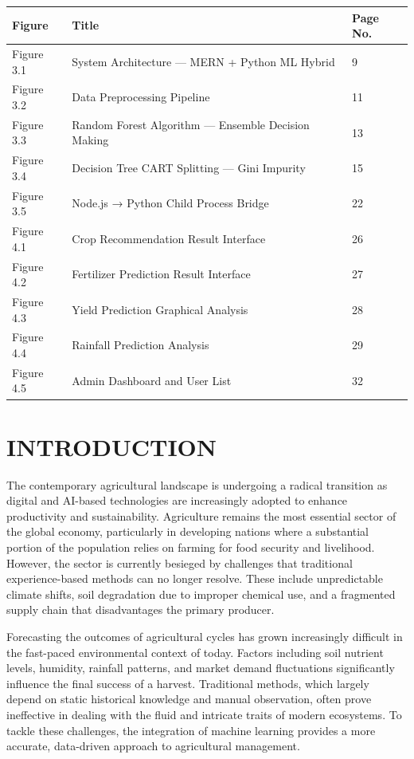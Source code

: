 \documentclass[12pt,a4paper]{report}
\begin{document}
\begin{table}[h!]
\centering
\begin{tabular}{|l|l|l|}
\hline
Figure & Title & Page No. \\ \hline
Figure 3.1 & System Architecture — MERN + Python ML Hybrid & 9 \\ \hline
Figure 3.2 & Data Preprocessing Pipeline & 11 \\ \hline
Figure 3.3 & Random Forest Algorithm — Ensemble Decision Making & 13 \\ \hline
Figure 3.4 & Decision Tree CART Splitting — Gini Impurity & 15 \\ \hline
Figure 3.5 & Node.js → Python Child Process Bridge & 22 \\ \hline
Figure 4.1 & Crop Recommendation Result Interface & 26 \\ \hline
Figure 4.2 & Fertilizer Prediction Result Interface & 27 \\ \hline
Figure 4.3 & Yield Prediction Graphical Analysis & 28 \\ \hline
Figure 4.4 & Rainfall Prediction Analysis & 29 \\ \hline
Figure 4.5 & Admin Dashboard and User List & 32 \\ \hline
\end{tabular}
\end{table}

\newpage

\newpage

\chapter{INTRODUCTION}

The contemporary agricultural landscape is undergoing a radical transition as digital and AI-based technologies are increasingly adopted to enhance productivity and sustainability. Agriculture remains the most essential sector of the global economy, particularly in developing nations where a substantial portion of the population relies on farming for food security and livelihood. However, the sector is currently besieged by challenges that traditional experience-based methods can no longer resolve. These include unpredictable climate shifts, soil degradation due to improper chemical use, and a fragmented supply chain that disadvantages the primary producer.

Forecasting the outcomes of agricultural cycles has grown increasingly difficult in the fast-paced environmental context of today. Factors including soil nutrient levels, humidity, rainfall patterns, and market demand fluctuations significantly influence the final success of a harvest. Traditional methods, which largely depend on static historical knowledge and manual observation, often prove ineffective in dealing with the fluid and intricate traits of modern ecosystems. To tackle these challenges, the integration of machine learning provides a more accurate, data-driven approach to agricultural management.
\end{document}
